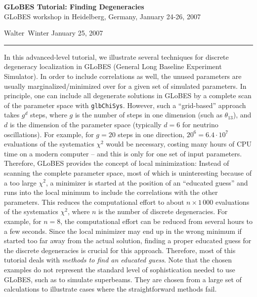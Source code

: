\documentclass[12pt,a4paper]{article}
\begin{document}
\vspace*{-3cm}
\begin{center}
{\large\bf GLoBES Tutorial: Finding Degeneracies}\\[0.3cm]
GLoBES workshop in Heidelberg, Germany, January 24-26, 2007
\end{center}
\vspace*{2mm}

Walter\ Winter \hfill January 25, 2007

\bigskip
\hrule
\vspace*{4mm}

{\small
In this advanced-level tutorial, we illustrate several techniques for discrete degeneracy localization in GLoBES (General Long Baseline Experiment Simulator). In order to include correlations as well, the unused parameters are usually marginalized/minimized over for a given set of simulated parameters. In principle, one can include all degenerate solutions in GLoBES by a complete scan of the parameter space with {\tt glbChiSys}. However, such a ``grid-based'' approach takes $g^d$ steps, where $g$ is the number of steps in one dimension (such as $\theta_{13}$), and $d$ is the dimension of the parameter space (typically $d=6$ for neutrino oscillations). For example, for 
$g=20$ steps in one direction, $20^6 = 6.4 \cdot 10^7$ evaluations of the systematics $\chi^2$
would be necessary, costing many hours of CPU time on a modern computer -- and this is only
for one set of input parameters. Therefore, GLoBES provides the concept of local minimization: Instead of scanning the complete parameter space, most of which is uninteresting because of a too large $\chi^2$,
a minimizer is started at the position of an ``educated guess'' and runs into the local minimum to include the correlations with the other parameters.
This reduces the computational effort to about $n \times 1 \, 000$ evaluations of the systematics $\chi^2$, where $n$ is the number of discrete degeneracies. For example, for $n=8$, the computational effort can be reduced from several hours to a few seconds. Since the local minimizer may end up in the wrong minimum if started too far away from the actual solution, finding a proper educated guess for the discrete degeneracies is crucial for this approach. Therefore, most of this tutorial deals with {\em methods to find an educated guess}. Note that the chosen examples do not represent the standard level of sophistication needed to use GLoBES, such as to simulate superbeams. They are chosen from a large set of calculations to illustrate cases where the straightforward methods fail.
}
\end{document}

